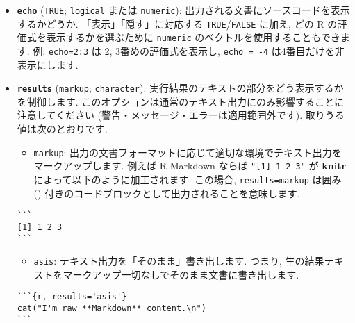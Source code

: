 \documentclass[
  lualatex,ja=standard,jafont=noto-otf]{bxjsreport}
\providecommand{\tightlist}{%
  \setlength{\itemsep}{0pt}\setlength{\parskip}{0pt}}
\begin{document}
\begin{itemize}
\tightlist
\item
  \textbf{\texttt{echo}} (\texttt{TRUE}; \texttt{logical} または
  \texttt{numeric}): 出力される文書にソースコードを表示するかどうか.
  「表示」「隠す」に対応する \texttt{TRUE}/\texttt{FALSE} に加え, どの R
  の評価式を表示するかを選ぶために \texttt{numeric}
  のベクトルを使用することもできます. 例: \texttt{echo=2:3} は 2,
  3番めの評価式を表示し, \texttt{echo\ =\ -4}
  は4番目だけを非表示にします.
\item
  \textbf{\texttt{results}}
  (\texttt{\textquotesingle{}markup\textquotesingle{}};
  \texttt{character}):
  実行結果のテキストの部分をどう表示するかを制御します.
  このオプションは通常のテキスト出力にのみ影響することに注意してください
  (警告・メッセージ・エラーは適用範囲外です).
  取りうる値は次のとおりです.

  \begin{itemize}
  \tightlist
  \item
    \texttt{markup}:
    出力の文書フォーマットに応じて適切な環境でテキスト出力をマークアップします.
    例えば R Markdown ならば \texttt{"{[}1{]}\ 1\ 2\ 3"} が
    \textbf{knitr} によって以下のように加工されます. この場合,
    \texttt{results=\textquotesingle{}markup\textquotesingle{}} は囲み
    (\texttt{\textasciigrave{}\textasciigrave{}\textasciigrave{}})
    付きのコードブロックとして出力されることを意味します.
  \end{itemize}

\begin{verbatim}
```
[1] 1 2 3
```
\end{verbatim}

  \begin{itemize}
  \tightlist
  \item
    \texttt{asis}: テキスト出力を「そのまま」書き出します. つまり,
    生の結果テキストをマークアップ一切なしでそのまま文書に書き出します.
  \end{itemize}

\begin{verbatim}
```{r, results='asis'}
cat("I'm raw **Markdown** content.\n")
```
\end{verbatim}


\end{itemize}
\end{document}
